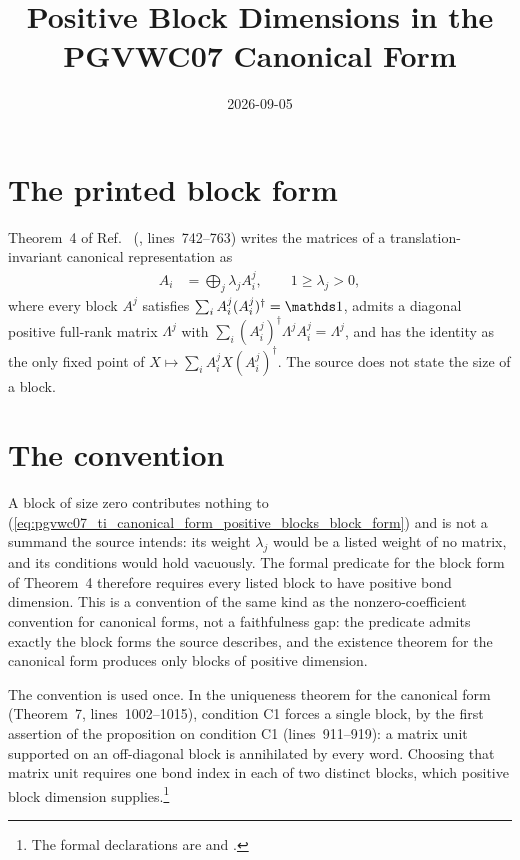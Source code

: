 \documentclass{article}
\title{Positive Block Dimensions in the PGVWC07 Canonical Form}
\author{}
\date{2026-09-05}
\begin{document}
\maketitle
{}

\section{The printed block form}

Theorem~4 of Ref.~\cite{PerezGarcia2007Matrix}
(, lines~742--763) writes the
matrices of a translation-invariant canonical representation as
\begin{align}
    A_i
     & =\bigoplus_j\lambda_jA_i^j,
    \qquad 1\ge\lambda_j>0,
    \label{eq:pgvwc07_ti_canonical_form_positive_blocks_block_form}
\end{align}
where every block $A^j$ satisfies $\sum_iA_i^j(A_i^j)^\dagger=\Id$, admits a
diagonal positive full-rank matrix $\Lambda^j$ with
$\sum_i(A_i^j)^\dagger\Lambda^jA_i^j=\Lambda^j$, and has the identity as the
only fixed point of $X\mapsto\sum_iA_i^jX(A_i^j)^\dagger$. The source does not
state the size of a block.

\section{The convention}

A block of size zero contributes nothing to
(\ref{eq:pgvwc07_ti_canonical_form_positive_blocks_block_form}) and is not a
summand the source intends: its weight $\lambda_j$ would be a listed weight of
no matrix, and its conditions would hold vacuously. The formal predicate for
the block form of Theorem~4 therefore requires every listed block to have
positive bond dimension. This is a convention of the same kind as the
nonzero-coefficient convention for canonical forms, not a faithfulness gap:
the predicate admits exactly the block forms the source describes, and the
existence theorem for the canonical form produces only blocks of positive
dimension.

The convention is used once. In the uniqueness theorem for the canonical
form (Theorem~7, lines~1002--1015), condition C1 forces a single block, by the
first assertion of the proposition on condition C1 (lines~911--919): a matrix
unit supported on an off-diagonal block is annihilated by every word. Choosing
that matrix unit requires one bond index in each of two distinct blocks, which
positive block dimension supplies.\footnote{The formal declarations are
     and
    .}



\end{document}
